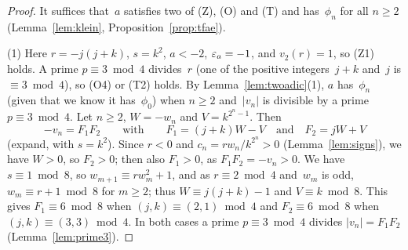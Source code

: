 \begin{proof}
  \leanok
  It suffices that~$a$ satisfies two of (Z), (O) and (T) and has~$\phi_n$ for all $n \ge 2$
  (Lemma~\ref{lem:klein}, Proposition~\ref{prop:tfae}).

  (1) Here $r = -j(j + k)$, $s = k^2$, $a < -2$, $\varepsilon_a = -1$, and $v_2(r) = 1$, so (Z1) holds.
  A prime $p \equiv 3 \bmod 4$ divides~$r$ (one of the positive integers~$j + k$ and~$j$ is
  $\equiv 3 \bmod 4$), so (O4) or (T2) holds. By Lemma~\ref{lem:twoadic}(1), $a$
  has~$\phi_n$ (given that we know it has~$\phi_0$) when $n \ge 2$ and~$|v_n|$ is divisible by a
  prime $p \equiv 3 \bmod 4$. Let $n \ge 2$, $W = -w_n$ and $V = k^{2^n - 1}$. Then
  \[ -v_n = F_1 F_2 \qquad \text{with} \qquad F_1 = (j + k) W - V \quad \text{and} \quad
     F_2 = j W + V \]
  (expand, with $s = k^2$). Since $r < 0$ and $c_n = r w_n / k^{2^n} > 0$
  (Lemma~\ref{lem:signs}), we have $W > 0$, so $F_2 > 0$; then also $F_1 > 0$, as
  $F_1 F_2 = -v_n > 0$. We have $s \equiv 1 \bmod 8$, so $w_{m+1} \equiv r w_m^2 + 1$, and as $r \equiv 2 \bmod 4$
  and~$w_m$ is odd, $w_m \equiv r + 1 \bmod 8$ for $m \ge 2$; thus $W \equiv j(j + k) - 1$ and
  $V \equiv k \bmod 8$. This gives $F_1 \equiv 6 \bmod 8$ when $(j, k) \equiv (2, 1) \bmod 4$
  and $F_2 \equiv 6 \bmod 8$ when $(j, k) \equiv (3, 3) \bmod 4$. In both cases a prime
  $p \equiv 3 \bmod 4$ divides $|v_n| = F_1 F_2$ (Lemma~\ref{lem:prime3}).


\end{proof}

